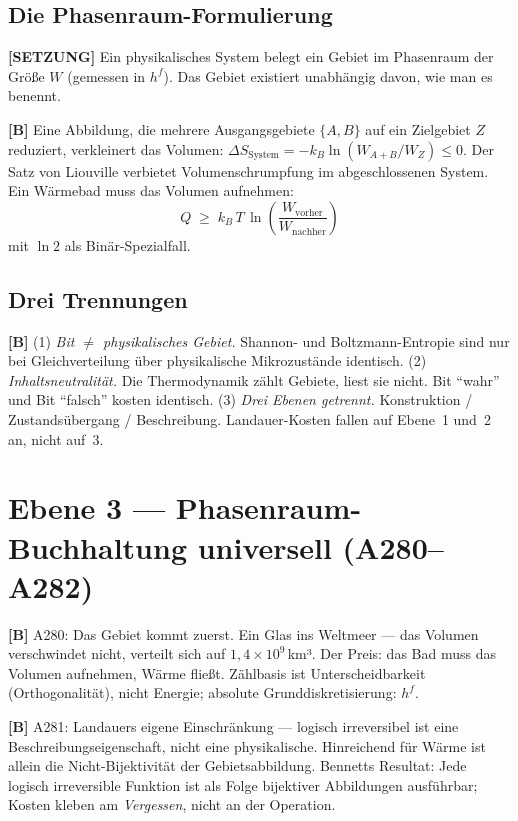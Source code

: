\subsection{Die Phasenraum-Formulierung}

\textbf{[SETZUNG]} Ein physikalisches System belegt ein Gebiet im
Phasenraum der Größe $W$ (gemessen in $h^f$). Das Gebiet existiert
unabhängig davon, wie man es benennt.

\textbf{[B]} Eine Abbildung, die mehrere Ausgangsgebiete $\{A, B\}$
auf ein Zielgebiet $Z$ reduziert, verkleinert das Volumen:
$\Delta S_\text{System} = -k_B \ln(W_{A+B}/W_Z) \le 0$.
Der Satz von Liouville verbietet Volumenschrumpfung im abgeschlossenen
System. Ein Wärmebad muss das Volumen aufnehmen:
\[
  \boxed{Q \;\ge\; k_B\,T\,\ln\!\left(\frac{W_\text{vorher}}{W_\text{nachher}}\right)}
\]
mit $\ln 2$ als Binär-Spezialfall.

\subsection{Drei Trennungen}

\textbf{[B]}
(1) \emph{Bit $\ne$ physikalisches Gebiet.} Shannon- und Boltzmann-Entropie
sind nur bei Gleichverteilung über physikalische Mikrozustände identisch.
(2) \emph{Inhaltsneutralität.} Die Thermodynamik zählt Gebiete, liest sie
nicht. Bit \enquote{wahr} und Bit \enquote{falsch} kosten identisch.
(3) \emph{Drei Ebenen getrennt.} Konstruktion / Zustandsübergang / Beschreibung.
Landauer-Kosten fallen auf Ebene~1 und~2 an, nicht auf~3.

\section{Ebene 3 --- Phasenraum-Buchhaltung universell (A280--A282)}

\textbf{[B]} A280: Das Gebiet kommt zuerst. Ein Glas ins Weltmeer ---
das Volumen verschwindet nicht, verteilt sich auf
$1{,}4 \times 10^9$\,km³. Der Preis: das Bad muss das Volumen
aufnehmen, Wärme fließt. Zählbasis ist Unterscheidbarkeit
(Orthogonalität), nicht Energie; absolute Grunddiskretisierung: $h^f$.

\textbf{[B]} A281: Landauers eigene Einschränkung --- logisch irreversibel
ist eine Beschreibungseigenschaft, nicht eine physikalische.
Hinreichend für Wärme ist allein die Nicht-Bijektivität der
Gebietsabbildung. Bennetts Resultat: Jede logisch irreversible Funktion
ist als Folge bijektiver Abbildungen ausführbar; Kosten kleben am
\emph{Vergessen}, nicht an der Operation.

